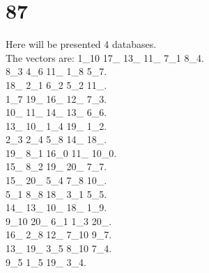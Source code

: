 \chapter{87}
\indent Here will be presented 4 databases.\\
The vectors are:
1\_10 17\_ 13\_ 11\_ 7\_1 8\_4.\\8\_3 4\_6 11\_ 1\_8 5\_7.\\18\_ 2\_1 6\_2 5\_2 11\_.\\1\_7 19\_ 16\_ 12\_ 7\_3.\\10\_ 11\_ 14\_ 13\_ 6\_6.\\13\_ 10\_ 1\_4 19\_ 1\_2.\\2\_3 2\_4 5\_8 14\_ 18\_.\\19\_ 8\_1 16\_0 11\_ 10\_0.\\15\_ 8\_2 19\_ 20\_ 7\_7.\\15\_ 20\_ 5\_4 7\_8 10\_.\\5\_1 8\_8 18\_ 3\_1 5\_5.\\14\_ 13\_ 10\_ 18\_ 1\_9.\\9\_10 20\_ 6\_1 1\_3 20\_.\\16\_ 2\_8 12\_ 7\_10 9\_7.\\13\_ 19\_ 3\_5 8\_10 7\_4.\\9\_5 1\_5 19\_ 3\_4.\\
